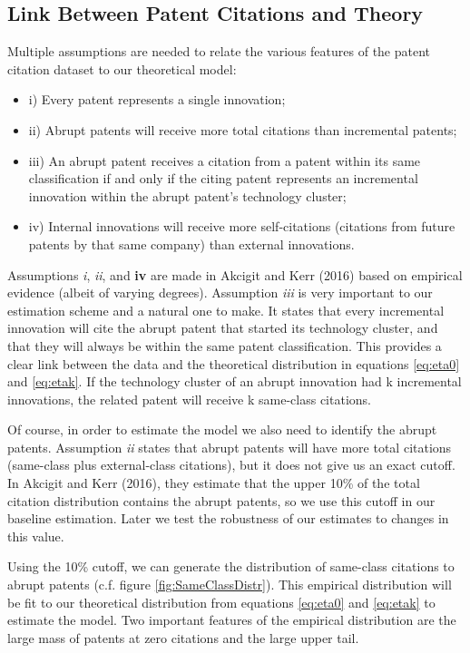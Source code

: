 \documentclass[letterpaper,12pt]{article}
\theoremstyle{definition}
\begin{document}
\subsection{Link Between Patent Citations and Theory}
Multiple assumptions are needed to relate the various features of the patent citation dataset to our theoretical model:
\begin{itemize}
	\item i) Every patent represents a single innovation;
	\item ii) Abrupt patents will receive more total citations than incremental patents;
	\item iii) An abrupt patent receives a citation from a patent within its same classification if and only if the citing patent represents an incremental innovation within the abrupt patent’s technology cluster;
	\item iv) Internal innovations will receive more self-citations (citations from future patents by that same company) than external innovations.
\end{itemize}
Assumptions \textit{i}, \textit{ii}, and \textbf{iv} are made in Akcigit and Kerr (2016) based on empirical evidence (albeit of varying degrees). Assumption \textit{iii} is very important to our estimation scheme and a natural one to make. It states that every incremental innovation will cite the abrupt patent that started its technology cluster, and that they will always be within the same patent classification. This provides a clear link between the data and the theoretical distribution in equations \ref{eq:eta0} and \ref{eq:etak}. If the technology cluster of an abrupt innovation had k incremental innovations, the related patent will receive k same-class citations.

Of course, in order to estimate the model we also need to identify the abrupt patents. Assumption \textit{ii} states that abrupt patents will have more total citations (same-class plus external-class citations), but it does not give us an exact cutoff. In Akcigit and Kerr (2016), they estimate that the upper 10\% of the total citation distribution contains the abrupt patents, so we use this cutoff in our baseline estimation. Later we test the robustness of our estimates to changes in this value.

Using the 10\% cutoff, we can generate the distribution of same-class citations to abrupt patents (c.f. figure \ref{fig:SameClassDistr}). This empirical distribution will be fit to our theoretical distribution from equations \ref{eq:eta0} and \ref{eq:etak} to estimate the model. Two important features of the empirical distribution are the large mass of patents at zero citations and the large upper tail.
\end{document}

